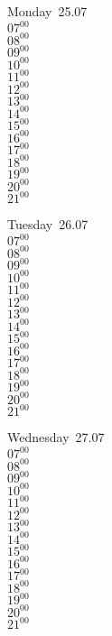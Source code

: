 \documentclass[11pt,a4paper]{book}\usepackage[]{graphicx}\usepackage[]{color}
\begin{document}
\begin{headerbox}
\end{headerbox}
\begin{weekdaybox}
  Monday~25.07\\
  { 
  \vfill
  $07^{00}$\\
$08^{00}$\\
$09^{00}$\\
$10^{00}$\\
$11^{00}$\\
$12^{00}$\\
$13^{00}$\\
$14^{00}$\\
$15^{00}$\\
$16^{00}$\\
$17^{00}$\\
$18^{00}$\\
$19^{00}$\\
$20^{00}$\\
$21^{00}$\\
  }
\end{weekdaybox}
\begin{weekdaybox}
  Tuesday~26.07\\
  { 
  \vfill
  $07^{00}$\\
$08^{00}$\\
$09^{00}$\\
$10^{00}$\\
$11^{00}$\\
$12^{00}$\\
$13^{00}$\\
$14^{00}$\\
$15^{00}$\\
$16^{00}$\\
$17^{00}$\\
$18^{00}$\\
$19^{00}$\\
$20^{00}$\\
$21^{00}$\\
  }
\end{weekdaybox}
\begin{weekdaybox}
  Wednesday~27.07\\
  { 
  \vfill
  $07^{00}$\\
$08^{00}$\\
$09^{00}$\\
$10^{00}$\\
$11^{00}$\\
$12^{00}$\\
$13^{00}$\\
$14^{00}$\\
$15^{00}$\\
$16^{00}$\\
$17^{00}$\\
$18^{00}$\\
$19^{00}$\\
$20^{00}$\\
$21^{00}$\\
  }
\end{weekdaybox}
\end{document}
